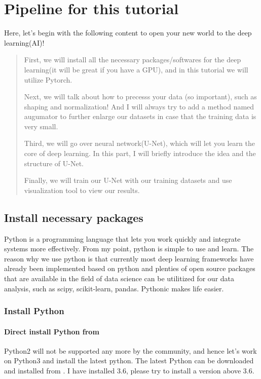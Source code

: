 \documentclass[letterpaper,10pt,english]{sphinxmanual}
\begin{document}
\chapter{Pipeline for this tutorial}
\label{\detokenize{index:pipeline-for-this-tutorial}}
Here, let’s begin with the following content to open your new world to the deep learning(AI)!
\begin{quote}

First, we will install all the necessary packages/softwares for the deep learning(it will be great if you have a GPU), and in this tutorial we will utilize Pytorch.

Next, we will talk about how to precesss your data (so important), such as shaping and normalization! And I will always try to add a method named augumator to further enlarge our datasets in case that the training data is very small.

Third, we will go over neural network(U-Net), which will let you learn the core of deep learning. In this part, I will briefly introduce the idea and the structure of U-Net.

Finally, we will train our U-Net with our training datasets and use visualization tool to view our results.
\end{quote}


\section{Install necessary packages}
\label{\detokenize{usage/installation:install-necessary-packages}}\label{\detokenize{usage/installation::doc}}
Python is a programming language that lets you work quickly and integrate systems more effectively. From my point, python is simple to use and learn. The reason why we use python is that currently most deep learning frameworks have already been implemented based on python and plenties of open source packages that are available in the field of data science can be utilitized for our data analysis, such as scipy, scikit-learn, pandas. Pythonic makes life easier.


\subsection{Install Python}
\label{\detokenize{usage/installation:install-python}}

\subsubsection{Direct install Python from }
\label{\detokenize{usage/installation:direct-install-python-from-python}}
Python2 will not be supported any more by the community, and hence let’s work on Python3 and install the latest python. The latest Python can be downloaded and installed from  . I have installed 3.6, please try to install a version above 3.6.
\end{document}
